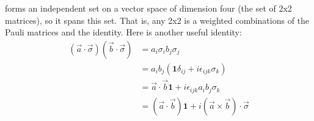 \documentclass{article}
\begin{document}
forms an independent set on a vector space of dimension four (the set of 2x2 matrices), so it spans this set. That is, any 2x2 is a weighted combinations of the Pauli matrices and the identity. Here is another useful identity:
\begin{align*}
(\vec{a}\cdot\vec{\sigma})(\vec{b}\cdot\vec{\sigma}) &= a_i\sigma_i b_j\sigma_j \\
&= a_ib_j(\mathbf{1}\delta_{ij} + i\epsilon_{ijk}\sigma_k) \\
&= \vec{a}\cdot\vec{b}\mathbf{1} + i\epsilon_{ijk}a_ib_j\sigma_k \\
&= (\vec{a}\cdot\vec{b})\mathbf{1} + i(\vec{a}\times\vec{b})\cdot \vec{\sigma}
\end{align*}
\end{document}
